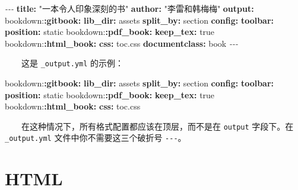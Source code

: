 \documentclass[
  12pt,
]{krantz}
\newenvironment{Shaded}{\begin{snugshade}}{\end{snugshade}}
\newcommand{\AttributeTok}[1]{\textcolor[rgb]{0.13,0.29,0.53}{#1}}
\newcommand{\CharTok}[1]{\textcolor[rgb]{0.31,0.60,0.02}{#1}}
\newcommand{\FunctionTok}[1]{\textcolor[rgb]{0.13,0.29,0.53}{\textbf{#1}}}
\newcommand{\KeywordTok}[1]{\textcolor[rgb]{0.13,0.29,0.53}{\textbf{#1}}}
\newcommand{\PreprocessorTok}[1]{\textcolor[rgb]{0.56,0.35,0.01}{\textit{#1}}}
\newcommand{\StringTok}[1]{\textcolor[rgb]{0.31,0.60,0.02}{#1}}
\theoremstyle{definition}
\theoremstyle{definition}
\theoremstyle{definition}
\theoremstyle{definition}
\theoremstyle{remark}
\begin{document}
\begin{Shaded}
\begin{Highlighting}[]
\PreprocessorTok{{-}{-}{-}}
\FunctionTok{title}\KeywordTok{:}\AttributeTok{ }\StringTok{"一本令人印象深刻的书"}
\FunctionTok{author}\KeywordTok{:}\AttributeTok{ }\StringTok{"李雷和韩梅梅"}
\FunctionTok{output}\KeywordTok{:}
\AttributeTok{  bookdown:}\FunctionTok{:gitbook}\KeywordTok{:}
\AttributeTok{    }\FunctionTok{lib\_dir}\KeywordTok{:}\AttributeTok{ assets}
\AttributeTok{    }\FunctionTok{split\_by}\KeywordTok{:}\AttributeTok{ section}
\AttributeTok{    }\FunctionTok{config}\KeywordTok{:}
\AttributeTok{      }\FunctionTok{toolbar}\KeywordTok{:}
\AttributeTok{        }\FunctionTok{position}\KeywordTok{:}\AttributeTok{ static}
\AttributeTok{  bookdown:}\FunctionTok{:pdf\_book}\KeywordTok{:}
\AttributeTok{    }\FunctionTok{keep\_tex}\KeywordTok{:}\AttributeTok{ }\CharTok{true}
\AttributeTok{  bookdown:}\FunctionTok{:html\_book}\KeywordTok{:}
\AttributeTok{    }\FunctionTok{css}\KeywordTok{:}\AttributeTok{ toc.css}
\FunctionTok{documentclass}\KeywordTok{:}\AttributeTok{ book}
\PreprocessorTok{{-}{-}{-}}
\end{Highlighting}
\end{Shaded}

  这是 \texttt{\_output.yml} 的示例：

\begin{Shaded}
\begin{Highlighting}[]
\AttributeTok{bookdown:}\FunctionTok{:gitbook}\KeywordTok{:}
\AttributeTok{  }\FunctionTok{lib\_dir}\KeywordTok{:}\AttributeTok{ assets}
\AttributeTok{  }\FunctionTok{split\_by}\KeywordTok{:}\AttributeTok{ section}
\AttributeTok{  }\FunctionTok{config}\KeywordTok{:}
\AttributeTok{    }\FunctionTok{toolbar}\KeywordTok{:}
\AttributeTok{      }\FunctionTok{position}\KeywordTok{:}\AttributeTok{ static}
\AttributeTok{bookdown:}\FunctionTok{:pdf\_book}\KeywordTok{:}
\AttributeTok{  }\FunctionTok{keep\_tex}\KeywordTok{:}\AttributeTok{ }\CharTok{true}
\AttributeTok{bookdown:}\FunctionTok{:html\_book}\KeywordTok{:}
\AttributeTok{  }\FunctionTok{css}\KeywordTok{:}\AttributeTok{ toc.css}
\end{Highlighting}
\end{Shaded}

  在这种情况下，所有格式配置都应该在顶层，而不是在 \texttt{output} 字段下。在 \texttt{\_output.yml} 文件中你不需要这三个破折号 \texttt{-\/-\/-}。

\hypertarget{html}{%
\section{HTML}\label{html}}
\end{document}
